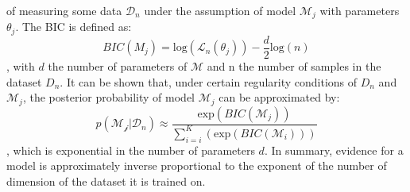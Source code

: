 of measuring some data $\mathcal{D}_n$ under the assumption of model $\mathcal{M}_j$ with parameters $\theta_j$. The BIC is defined as:
\begin{equation}
    BIC(M_j) = \text{log}(\mathcal{L}_n(\theta_j)) - \frac{d}{2} \text{log}(n)
\end{equation}
, with $d$ the number of parameters of $\mathcal{M}$ and n the number of samples in the dataset $D_n$.
It can be shown that, under certain regularity conditions of $D_n$ and $\mathcal{M}_j$, the posterior probability of model $\mathcal{M}_j$ can be approximated by:
\begin{equation}
    p(\mathcal{M_j}|\mathcal{D}_n) \approx \frac{\text{exp}(BIC(\mathcal{M}_j))}{\sum_{i=i}^K(\text{exp}(BIC(\mathcal{M}_i)))}
\end{equation}
, which is exponential in the number of parameters $d$.
In summary, evidence for a model is approximately inverse proportional to the exponent of the number of dimension of the dataset it is trained on.


